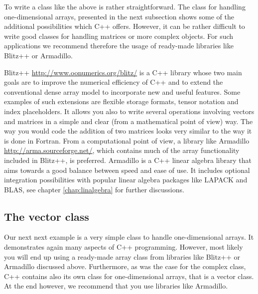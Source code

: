 To write a class like the above is rather straightforward.  
The class for handling one-dimensional arrays, presented in the next subsection shows  
some of the additional possibilities which C++ offers. 
However, it can be rather
difficult to write good classes for handling matrices or more complex objects.  For such applications we recommend therefore the usage
of ready-made libraries like   Blitz++ or Armadillo.

Blitz++ \url{http://www.oonumerics.org/blitz/}  is a C++ library whose two main goals are
to improve the numerical efficiency of C++ and to extend the conventional dense array model 
to incorporate new and useful features. Some examples of such extensions are 
flexible storage formats, tensor notation and index placeholders.
It allows you also to write several operations involving vectors and matrices in a simple and clear
(from a mathematical point of view) way. 
The way you would code the addition of two matrices looks very similar to the way it is done
in Fortran.   From a computational point of view, a library like Armadillo 
\url{http://arma.sourceforge.net/}, which contains
much of the array functionality included in Blitz++, is preferred. Armadillo is
a C++ linear algebra library that aims towards a good balance between speed and ease of use. It includes optional
integration possibilities with popular linear algebra packages like LAPACK and BLAS, see chapter \ref{chap:linalgebra}
for further discussions.

\subsection{The vector class}
Our next next example is a very simple class to handle one-dimensional arrays.
It demonstrates again many aspects of C++
programming. However, most likely you will end up using a ready-made array class
from libraries like Blitz++ or Armadillo discussed above.  Furthermore, as was the case for the complex class, C++ contains
also its own class for one-dimensional arrays, that is a vector class. At the end however, we recommend that you use
libraries like Armadillo. 

